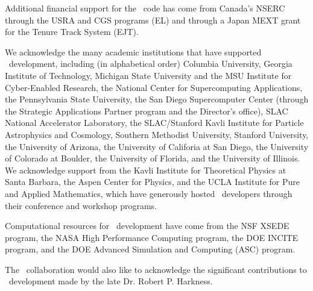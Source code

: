 Additional financial support for the \enzo\ code has come from
Canada's NSERC through the USRA and CGS programs (EL) and through a 
Japan MEXT grant for the Tenure Track System (EJT).

We acknowledge the  many academic institutions that have supported \enzo\
development, including (in alphabetical order)
Columbia University,
Georgia Institute of Technology,
Michigan State University and the MSU Institute for Cyber-Enabled
Research, 
the National Center for Supercomputing Applications, 
the Pennsylvania State University,
 the San Diego Supercomputer Center (through the Strategic Applications
Partner program and the Director’s office),
SLAC National Accelerator Laboratory,
the SLAC/Stanford Kavli Institute for Particle
Astrophysics and Cosmology,  
Southern Methodist University,
Stanford University,
the University of Arizona,
the University of Califoria at San Diego, 
the University of Colorado at Boulder,
the University of Florida,
and the University of Illinois.
We acknowledge support from the Kavli Institute for Theoretical
Physics at Santa Barbara, the Aspen Center for Physics, and the UCLA
Institute for Pure and Applied Mathematics, which have
generously hosted \enzo\ developers through their conference and
workshop programs.

Computational resources for \enzo\ development have come from the NSF
XSEDE program, the NASA High Performance Computing program, the DOE INCITE
program, and the DOE Advanced Simulation and Computing (ASC) program.

The \enzo\ collaboration would also like to acknowledge the significant contributions to
\enzo\ development made by the late Dr. Robert P. Harkness. 

